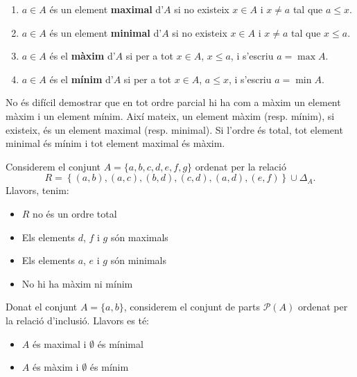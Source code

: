 \begin{enumerate}
\item $a\in A$ és un element \textbf{maximal} d'$A$ si no existeix $x\in
A$ i $x\neq a$ tal que $a\leq x$.

\item $a\in A$ és un element \textbf{minimal} d'$A$ si no existeix $x\in
A$ i $x\neq a$ tal que $x\leq a$.

\item $a\in A$ és el \textbf{màxim} d'$A$ si per a tot $x\in A$, $%
x\leq a$, i s'escriu $a=\max A$.

\item $a\in A$ és el \textbf{mínim} d'$A$ si per a tot $x\in A$, $%
a\leq x$, i s'escriu $a=\min A$.
\end{enumerate}

No és difícil demostrar que en tot ordre parcial hi ha com a màxim un element màxim i un element mínim. Així mateix, un
element màxim (resp. mínim), si existeix, és un element maximal
(resp. minimal). Si l'ordre és total, tot element minimal és mínim i tot element maximal és màxim.

\begin{exemple}
Considerem el conjunt $A=\{a,b,c,d,e,f,g\}$ ordenat per la relació%
\begin{equation*}
R=\left\{ (a,b),(a,c),(b,d),(c,d),(a,d),(e,f)\right\} \cup\Delta_{A}\text{.}
\end{equation*}
Llavors, tenim:

\begin{itemize}
\item $R$ no és un ordre total

\item Els elements $d$, $f$ i $g$ són maximals

\item Els elements $a$, $e$ i $g$ són minimals

\item No hi ha màxim ni mínim
\end{itemize}
\end{exemple}

\begin{exemple}
Donat el conjunt $A=\{a,b\}$, considerem el conjunt de parts $\mathcal{P}(A)$
ordenat per la relació d'inclusió. Llavors es té:

\begin{itemize}
\item $A$ és maximal i $\emptyset$ és mínimal

\item $A$ és màxim i $\emptyset$ és mínim
\end{itemize}
\end{exemple}

